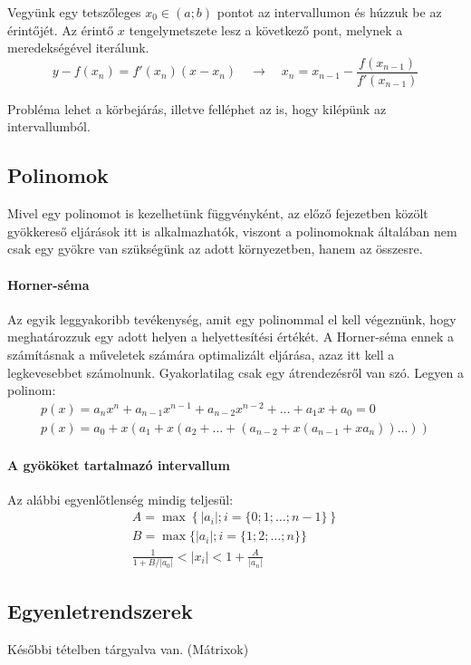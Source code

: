 \documentclass[../../main.tex]{subfiles}
\begin{document}
Vegyünk egy tetszőleges $x_0 \in (a; b)$ pontot az intervallumon és húzzuk
be az érintőjét. Az érintő $x$ tengelymetszete lesz a következő pont,
melynek a meredekségével iterálunk.
\[
  y - f(x_n) = f'(x_n)(x - x_n)
  \quad \rightarrow \quad x_n = x_{n-1} - \frac{f(x_{n-1})}{f'(x_{n-1})}
\]

Probléma lehet a körbejárás, illetve felléphet az is, hogy kilépünk az
intervallumból.

\subsection{Polinomok}

Mivel egy polinomot is kezelhetünk függvényként, az előző fejezetben közölt
gyökkereső eljárások itt is alkalmazhatók, viszont a polinomoknak általában
nem csak egy gyökre van szükségünk az adott környezetben, hanem az összesre.

\paragraph{Horner-séma}

Az egyik leggyakoribb tevékenység, amit egy polinommal el kell végeznünk,
hogy meghatározzuk egy adott helyen a helyettesítési értékét. A Horner-séma
ennek a számításnak a műveletek számára optimalizált eljárása, azaz itt kell a
legkevesebbet számolnunk. Gyakorlatilag csak egy átrendezésről van szó.
Legyen a polinom:
\begin{gather*}
  p(x)
  = a_n x^n
  + a_{n-1} x^{n-1}
  + a_{n-2} x^{n-2}
  + \dots
  + a_1 x
  + a_0
  = 0
  \\
  p(x)
  =
  a_0 + x (
  a_1 + x (
  a_2 + \dots + (
  a_{n-2} + x (
  a_{n-1} + x a_n
  )) \dots ))
\end{gather*}

\paragraph{A gyököket tartalmazó intervallum}

Az alábbi egyenlőtlenség mindig teljesül:
\begin{gather*}
  A = \max\left\{|a_i|; i = \{0;1;\dots;n-1\}\right\} \\
  B = \max\{|a_i|; i = \{1;2;\dots;n\}\} \\
  \frac{1}{1 + B / |a_0|} < |x_i| < 1 + \frac{A}{|a_n|}
\end{gather*}

\subsection{Egyenletrendszerek}

Későbbi tételben tárgyalva van. (Mátrixok)
\end{document}

